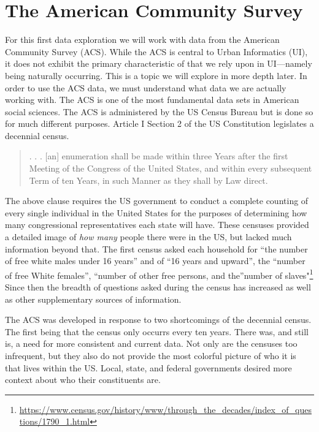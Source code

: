 \documentclass[
]{book}
\begin{document}
\hypertarget{the-american-community-survey}{%
\section{The American Community Survey}\label{the-american-community-survey}}

For this first data exploration we will work with data from the American Community Survey (ACS). While the ACS is central to Urban Informatics (UI), it does not exhibit the primary characteristic of that we rely upon in UI---namely being naturally occurring. This is a topic we will explore in more depth later. In order to use the ACS data, we must understand what data we are actually working with. The ACS is one of the most fundamental data sets in American social sciences. The ACS is administered by the US Census Bureau but is done so for much different purposes. Article I Section 2 of the US Constitution legislates a decennial census.

\begin{quote}
. . . {[}an{]} enumeration shall be made within three Years after the first Meeting of the Congress of the United States, and within every subsequent Term of ten Years, in such Manner as they shall by Law direct.
\end{quote}

The above clause requires the US government to conduct a complete counting of every single individual in the United States for the purposes of determining how many congressional representatives each state will have. These censuses provided a detailed image of \emph{how many} people there were in the US, but lacked much information beyond that. The first census asked each household for ``the number of free white males under 16 years'' and of ``16 years and upward'', the ``number of free White females'', ``number of other free persons, and the''number of slaves"\footnote{\url{https://www.census.gov/history/www/through_the_decades/index_of_questions/1790_1.html}} Since then the breadth of questions asked during the census has increased as well as other supplementary sources of information.

The ACS was developed in response to two shortcomings of the decennial census. The first being that the census only occurrs every ten years. There was, and still is, a need for more consistent and current data. Not only are the censuses too infrequent, but they also do not provide the most colorful picture of who it is that lives within the US. Local, state, and federal governments desired more context about who their constituents are.
\end{document}
